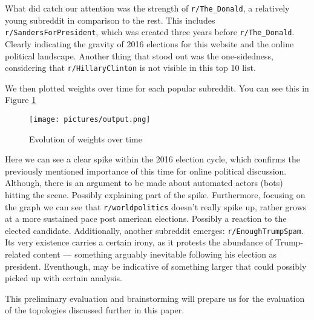 \documentclass{article}
\theoremstyle{definition}
\begin{document}
What did catch our attention was the strength of \texttt{r/The\_Donald}, a relatively young subreddit in comparison to the rest. This includes \texttt{r/SandersForPresident}, which was created three years before \texttt{r/The\_Donald}. Clearly indicating the gravity of 2016 elections for this website and the online political landscape. Another thing that stood out was the one-sidedness, considering that \texttt{r/HillaryClinton} is not visible in this top 10 list.

We then plotted weights over time for each popular subreddit. You  can see this in Figure \ref{fig:weight_evolution}

\begin{figure}[htb]
    \centering
    \texttt{[image: pictures/output.png]}
    \caption{Evolution of weights over time}
    \label{fig:weight_evolution}
\end{figure}
\newpage
Here we can see a clear spike within the 2016 election cycle, which confirms the previously mentioned importance of this time for online political discussion. Although, there is an argument to be made about automated actors (bots) hitting the scene. Possibly explaining part of the spike. %
Furthermore, focusing on the graph we can see that \texttt{r/worldpolitics} doesn't really spike up, rather grows at a more sustained pace post american elections. Possibly a reaction to the elected candidate. Additionally, another subreddit emerges: \texttt{r/EnoughTrumpSpam}. Its very existence carries a certain irony, as it protests the abundance of Trump-related content — something arguably inevitable following his election as president. Eventhough, may be indicative of something larger that could possibly picked up with certain analysis.

This preliminary evaluation and brainstorming will prepare us for the evaluation of the topologies discussed further in this paper.




\end{document}
